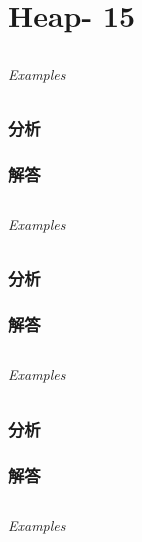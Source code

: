 \documentclass[UTF8,a4paper,12pt]{ctexbook}
\begin{document}
\chapter{Heap- 15}
\section{}
	
	\subparagraph{Examples}
	
	\subsection{分析}
	
	\subsection{解答}
	
\section{}
	
	\subparagraph{Examples}
	
	\subsection{分析}
	
	\subsection{解答}
	
\section{}
	
	\subparagraph{Examples}
	
	\subsection{分析}
	
	\subsection{解答}
	
\section{}
	
	\subparagraph{Examples}
	
\end{document}
